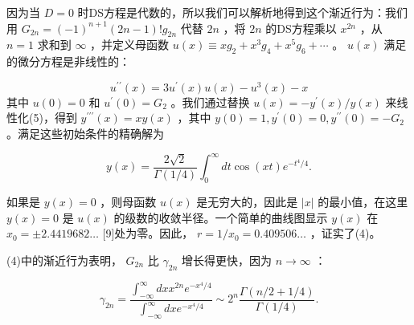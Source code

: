 \documentclass[UTF8]{article}
\begin{document}
因为当 \( D=0 \) 时DS方程是代数的，所以我们可以解析地得到这个渐近行为：我们用 \( G_{2 n}=(-1)^{n+1}(2 n-1) ! g_{2 n} \) 代替 \( 2 n \) ，将 \( 2 n \) 的DS方程乘以 \( x^{2 n} \) ，从 \( n=1 \) 求和到 \( \infty \) ，并定义母函数 \( u(x) \equiv x g_{2}+x^{3} g_{4}+x^{5} g_{6}+\cdots \) 。 \( u(x) \) 满足的微分方程是非线性的：




 \[u^{\prime \prime}(x)=3 u^{\prime}(x) u(x)-u^{3}(x)-x
\] 其中 \( u(0)=0 \) 和 \( u^{\prime}(0)=G_{2} \) 。我们通过替换 \( u(x)=-y^{\prime}(x) / y(x) \) 来线性化(5)，得到 \( y^{\prime \prime \prime}(x)=x y(x) \) ，其中 \( y(0)=1, y^{\prime}(0)=0, y^{\prime \prime}(0)=-G_{2} \) 。满足这些初始条件的精确解为




 \[y(x)=\frac{2 \sqrt{2}}{\Gamma(1 / 4)} \int_{0}^{\infty} d t \cos (x t) e^{-t^{4} / 4} .
\] 


如果是 \( y(x)=0 \) ，则母函数 \( u(x) \) 是无穷大的，因此是 \( |x| \) 的最小值，在这里 \( y(x)=0 \) 是 \( u(x) \) 的级数的收敛半径。一个简单的曲线图显示 \( y(x) \) 在 \( x_{0}= \pm 2.4419682 \ldots \) [9]处为零。因此， \( r=1 / x_{0}=0.409506 \ldots \) ，证实了(4)。




(4)中的渐近行为表明， \( G_{2 n} \) 比 \( \gamma_{2 n} \) 增长得更快，因为 \( n \rightarrow \infty \) ：


 \[
\gamma_{2 n}=\frac{\int_{-\infty}^{\infty} d x x^{2 n} e^{-x^{4} / 4}}{\int_{-\infty}^{\infty} d x e^{-x^{4} / 4}} \sim 2^{n} \frac{\Gamma(n / 2+1 / 4)}{\Gamma(1 / 4)} .
\] 
\end{document}
